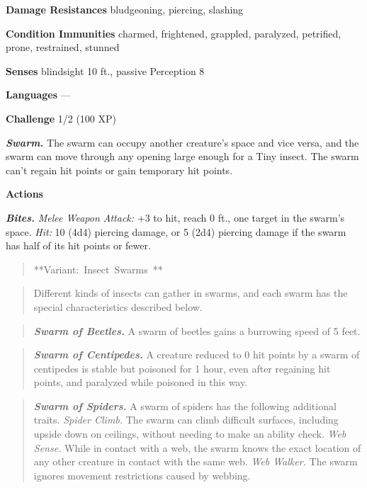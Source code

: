 \documentclass[
]{article}
\begin{document}
\textbf{Damage Resistances} bludgeoning, piercing, slashing

\textbf{Condition Immunities} charmed, frightened, grappled, paralyzed,
petrified, prone, restrained, stunned

\textbf{Senses} blindsight 10 ft., passive Perception 8

\textbf{Languages} ---

\textbf{Challenge} 1/2 (100 XP)

\emph{\textbf{Swarm.}} The swarm can occupy another creature's space and
vice versa, and the swarm can move through any opening large enough for
a Tiny insect. The swarm can't regain hit points or gain temporary hit
points.

\textbf{Actions}

\emph{\textbf{Bites.}} \emph{Melee Weapon Attack:} +3 to hit, reach 0
ft., one target in the swarm's space. \emph{Hit:} 10 (4d4) piercing
damage, or 5 (2d4) piercing damage if the swarm has half of its hit
points or fewer.

\begin{quote}
**Variant:~Insect~Swarms~**
\end{quote}

\begin{quote}
Different kinds of insects can gather in swarms, and each swarm has the
special characteristics described below.
\end{quote}

\begin{quote}
\emph{\textbf{Swarm of Beetles.}} A swarm of beetles gains a burrowing
speed of 5 feet.
\end{quote}

\begin{quote}
\emph{\textbf{Swarm of Centipedes.}} A creature reduced to 0 hit points
by a swarm of centipedes is stable but poisoned for 1 hour, even after
regaining hit points, and paralyzed while poisoned in this way.
\end{quote}

\begin{quote}
\emph{\textbf{Swarm of Spiders.}} A swarm of spiders has the following
additional traits. \emph{Spider Climb.} The swarm can climb difficult
surfaces, including upside down on ceilings, without needing to make an
ability check. \emph{Web Sense.} While in contact with a web, the swarm
knows the exact location of any other creature in contact with the same
web. \emph{Web Walker.} The swarm ignores movement restrictions caused
by webbing.
\end{quote}
\end{document}
